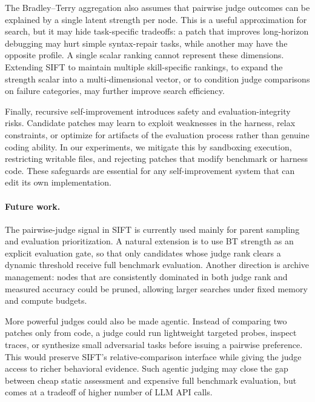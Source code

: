\documentclass{article}
\begin{document}
The Bradley--Terry aggregation also assumes that pairwise judge outcomes can be explained by a single latent strength per node. This is a useful approximation for search, but it may hide task-specific tradeoffs: a patch that improves long-horizon debugging may hurt simple syntax-repair tasks, while another may have the opposite profile. A single scalar ranking cannot represent these dimensions. Extending SIFT to maintain multiple skill-specific rankings, to expand the strength scalar into a multi-dimensional vector, or to condition judge comparisons on failure categories, may further improve search efficiency.

Finally, recursive self-improvement introduces safety and evaluation-integrity risks. Candidate patches may learn to exploit weaknesses in the harness, relax constraints, or optimize for artifacts of the evaluation process rather than genuine coding ability. In our experiments, we mitigate this by sandboxing execution, restricting writable files, and rejecting patches that modify benchmark or harness code. These safeguards are essential for any self-improvement system that can edit its own implementation.

\paragraph{Future work.}
The pairwise-judge signal in SIFT is currently used mainly for parent sampling and evaluation prioritization. A natural extension is to use BT strength as an explicit evaluation gate, so that only candidates whose judge rank clears a dynamic threshold receive full benchmark evaluation. Another direction is archive management: nodes that are consistently dominated in both judge rank and measured accuracy could be pruned, allowing larger searches under fixed memory and compute budgets.

More powerful judges could also be made agentic. Instead of comparing two patches only from code, a judge could run lightweight targeted probes, inspect traces, or synthesize small adversarial tasks before issuing a pairwise preference. This would preserve SIFT's relative-comparison interface while giving the judge access to richer behavioral evidence. Such agentic judging may close the gap between cheap static assessment and expensive full benchmark evaluation, but comes at a tradeoff of higher number of LLM API calls.
\end{document}
